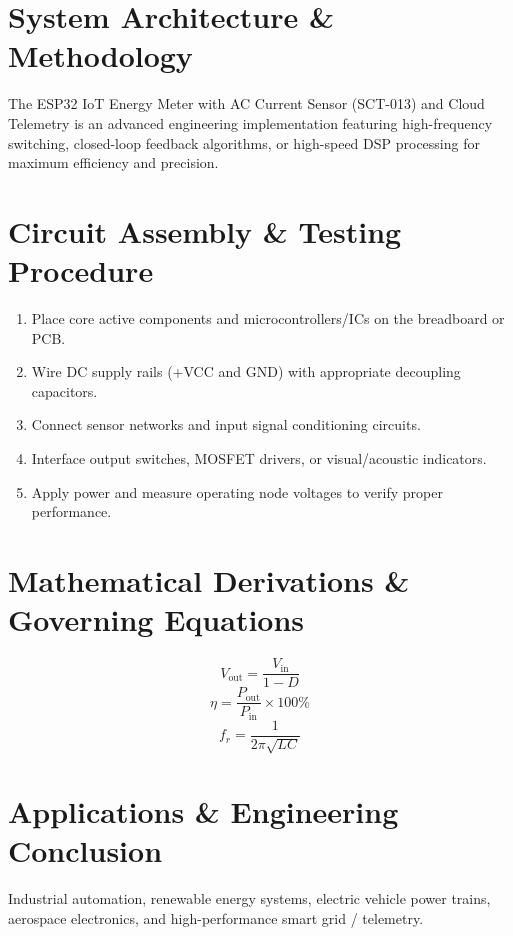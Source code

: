 \documentclass[11pt,a4paper]{article}
\begin{document}
\section{System Architecture \& Methodology}
The ESP32 IoT Energy Meter with AC Current Sensor (SCT-013) and Cloud Telemetry is an advanced engineering implementation featuring high-frequency switching, closed-loop feedback algorithms, or high-speed DSP processing for maximum efficiency and precision.

\section{Circuit Assembly \& Testing Procedure}
\begin{enumerate}
    \item Place core active components and microcontrollers/ICs on the breadboard or PCB.
    \item Wire DC supply rails (+VCC and GND) with appropriate decoupling capacitors.
    \item Connect sensor networks and input signal conditioning circuits.
    \item Interface output switches, MOSFET drivers, or visual/acoustic indicators.
    \item Apply power and measure operating node voltages to verify proper performance.
\end{enumerate}

\section{Mathematical Derivations \& Governing Equations}
\begin{equation}
V_{\text{out}} = \frac{V_{\text{in}}}{1 - D}
\end{equation}
\begin{equation}
\eta = \frac{P_{\text{out}}}{P_{\text{in}}} \times 100\%
\end{equation}
\begin{equation}
f_r = \frac{1}{2\pi \sqrt{L C}}
\end{equation}

\section{Applications \& Engineering Conclusion}
Industrial automation, renewable energy systems, electric vehicle power trains, aerospace electronics, and high-performance smart grid / telemetry.
\end{document}
